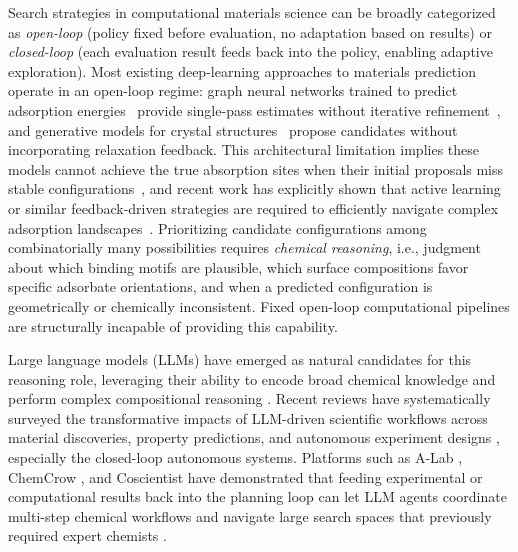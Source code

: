 Search strategies in computational materials science can be broadly categorized as \textit{open-loop} (policy fixed before evaluation, no adaptation based on results) or \textit{closed-loop} (each evaluation result feeds back into the policy, enabling adaptive exploration).
Most existing deep-learning approaches to materials prediction operate in an open-loop regime: graph neural networks trained to predict adsorption energies~\cite{reiser2022gnn} provide single-pass estimates without iterative refinement~\cite{chowdhury2018prediction}, and generative models for crystal structures~\cite{xie2022cdvae,zeni2025mattergen} propose candidates without incorporating relaxation feedback.
This architectural limitation implies these models cannot achieve the true absorption sites when their initial proposals miss stable configurations~\cite{abolhasani2023rise,yang2025stable}, and recent work has explicitly shown that active learning or similar feedback-driven strategies are required to efficiently navigate complex adsorption landscapes~\cite{yang2025stable}.
Prioritizing candidate configurations among combinatorially many possibilities requires \textit{chemical reasoning}, i.e., judgment about which binding motifs are plausible, which surface compositions favor specific adsorbate orientations, and when a predicted configuration is geometrically or chemically inconsistent.
Fixed open-loop computational pipelines are structurally incapable of providing this capability.

Large language models (LLMs) have emerged as natural candidates for this reasoning role, leveraging their ability to encode broad chemical knowledge and perform complex compositional reasoning \cite{mirza2024chembench,bran2024chemcrow,jablonka2023fourteen,ramos2025review}. Recent reviews have systematically surveyed the transformative impacts of LLM-driven scientific workflows across material discoveries, property predictions, and autonomous experiment designs \cite{jiang2025applications,miret2025enabling,ramos2025review}, especially the closed-loop autonomous systems. Platforms such as A-Lab \cite{szymanski2023alab}, ChemCrow \cite{bran2024chemcrow}, and Coscientist \cite{boiko2023autonomous} have demonstrated that feeding experimental or computational results back into the planning loop can let LLM agents coordinate multi-step chemical workflows and navigate large search spaces that previously required expert chemists \cite{zimmermann2025llm,yang2026quasar,stewart2026graphagents,chandrasekhar2026catalyst,weietal2025agentic}.

